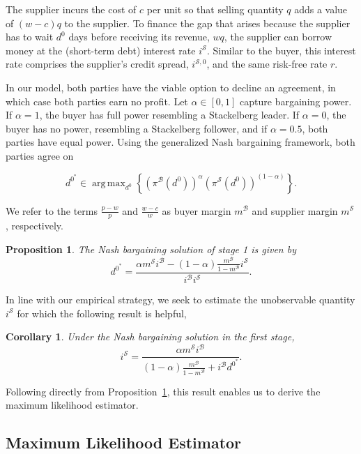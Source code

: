 \documentclass[A4,11pt]{article}
\newcommand{\bx}{\mathcal B}
\newcommand{\sx}{\mathcal S}
\newcommand{\MBX}{\frac{m^\bx}{1-m^\bx}}
\newcommand{\DNULL}{\frac{\alpha m^{\sx}i^{\bx}-\left(1-\alpha\right)\frac{m^{\bx}}{1-m^{\bx}}i^{\sx}}{i^{\bx}i^{\sx}}}
\renewcommand{\~}[1]{\tilde{#1}}
\renewcommand{\-}[1]{\overline{#1}}
\DeclareMathOperator*{\argmax}{arg\,max}
\newtheorem{proposition}{Proposition}
\newtheorem{corollary}{Corollary}
\begin{document}
\begin{appendices}
The supplier incurs the cost of $c$ per unit so that selling quantity $q$ adds a value of $(w-c)q$ to the supplier. To finance the gap that arises because the supplier has to wait $d^0$ days before receiving its revenue, $wq$, the supplier can borrow money at the (short-term debt) interest rate $i^{\sx}$. Similar to the buyer, this interest rate comprises the supplier's credit spread, $i^{\sx,0}$, and the same risk-free rate $r$. 

In our model, both parties have the viable option to decline an agreement, in which case both parties earn no profit. Let $\alpha\in\left[0,1\right]$ capture bargaining power. If $\alpha=1$, the buyer has full power resembling a Stackelberg leader. If $\alpha=0$, the buyer has no power, resembling a Stackelberg follower, and if $\alpha=0.5$, both parties have equal power. Using the generalized Nash bargaining framework, both parties agree on

\begin{equation}
d^{0^*} \in \argmax_{d^0}\left\{\left(\pi^{\bx}\left(d^{0}\right)\right)^\alpha\left(\pi^{\sx}\left(d^{0}\right)\right)^{\left(1-\alpha\right)}\right\}.
\end{equation}

We refer to the terms $\frac{p-w}{p}$ and $\frac{w-c}{w}$ as buyer margin $m^{\bx}$ and supplier margin $m^{\sx}$, respectively. 

\begin{proposition}\label{prop:d0}
The Nash bargaining solution of stage 1 is given by
\begin{equation}
d^{0^*} = \DNULL.
\end{equation}
\end{proposition}\noindent%

In line with our empirical strategy, we seek to estimate the unobservable quantity $i^{\sx}$ for which the following result is helpful,
\begin{corollary}\label{cor:is} Under the Nash bargaining solution in the first stage,
\begin{equation}
i^{\sx} = \frac{\alpha m^{\sx}i^{\bx}}{\left(1-\alpha\right)\MBX+i^{\bx}d^{0^*}}.
\end{equation}
\end{corollary}\noindent%
Following directly from Proposition~\ref{prop:d0}, this result enables us to derive the maximum likelihood estimator.
\subsection{Maximum Likelihood Estimator}


\end{appendices}
\end{document}
